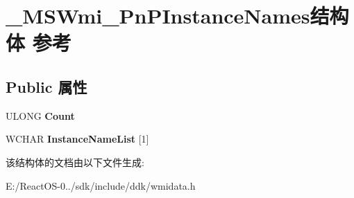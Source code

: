 \hypertarget{struct___m_s_wmi___pn_p_instance_names}{}\section{\+\_\+\+M\+S\+Wmi\+\_\+\+Pn\+P\+Instance\+Names结构体 参考}
\label{struct___m_s_wmi___pn_p_instance_names}
\subsection*{Public 属性}
\begin{DoxyCompactItemize}
\item 
\mbox{\label{struct___m_s_wmi___pn_p_instance_names_a4763668afb0f24581cdabc51b1ae03f9}} 
U\+L\+O\+NG {\bfseries Count}
\item 
\mbox{\label{struct___m_s_wmi___pn_p_instance_names_a23942b025db001ff31854a8d8ca62345}} 
W\+C\+H\+AR {\bfseries Instance\+Name\+List} \mbox{[}1\mbox{]}
\end{DoxyCompactItemize}


该结构体的文档由以下文件生成\+:\begin{DoxyCompactItemize}
\item 
E\+:/\+React\+O\+S-\/0../sdk/include/ddk/wmidata.\+h\end{DoxyCompactItemize}
